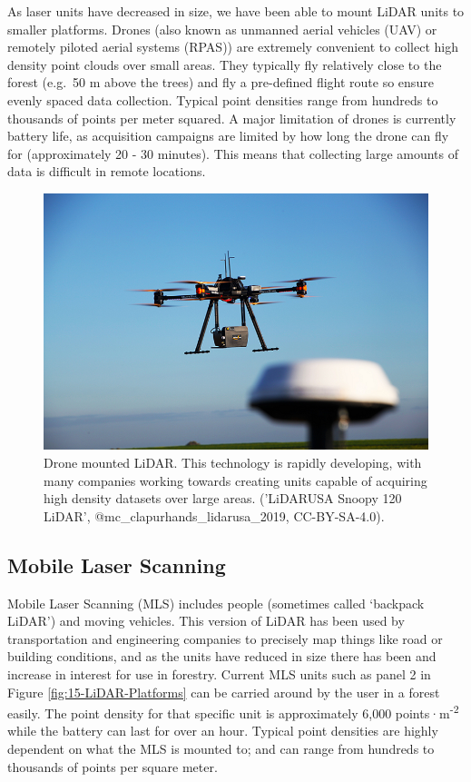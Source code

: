 \documentclass[
]{book}
\begin{document}
As laser units have decreased in size, we have been able to mount LiDAR units to smaller platforms. Drones (also known as unmanned aerial vehicles (UAV) or remotely piloted aerial systems (RPAS)) are extremely convenient to collect high density point clouds over small areas. They typically fly relatively close to the forest (e.g.~50 m above the trees) and fly a pre-defined flight route so ensure evenly spaced data collection. Typical point densities range from hundreds to thousands of points per meter squared. A major limitation of drones is currently battery life, as acquisition campaigns are limited by how long the drone can fly for (approximately 20 - 30 minutes). This means that collecting large amounts of data is difficult in remote locations.

\begin{figure}
\includegraphics[width=0.7\linewidth]{images/15-LiDAR-on-Drone} \caption{Drone mounted LiDAR. This technology is rapidly developing, with many companies working towards creating units capable of acquiring high density datasets over large areas. ('LiDARUSA Snoopy 120 LiDAR', @mc_clapurhands_lidarusa_2019,  CC-BY-SA-4.0).}\label{fig:15-LiDAR-on-Drone}
\end{figure}

\hypertarget{mobile-laser-scanning}{%
\subsection{Mobile Laser Scanning}\label{mobile-laser-scanning}}

Mobile Laser Scanning (MLS) includes people (sometimes called `backpack LiDAR') and moving vehicles. This version of LiDAR has been used by transportation and engineering companies to precisely map things like road or building conditions, and as the units have reduced in size there has been and increase in interest for use in forestry. Current MLS units such as panel 2 in Figure \ref{fig:15-LiDAR-Platforms} can be carried around by the user in a forest easily. The point density for that specific unit is approximately 6,000 points·m\textsuperscript{-2} while the battery can last for over an hour. Typical point densities are highly dependent on what the MLS is mounted to; and can range from hundreds to thousands of points per square meter.
\end{document}
